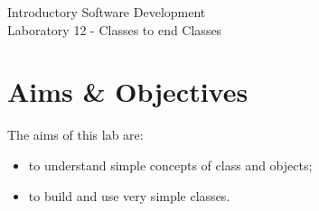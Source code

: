 \documentclass[12pt,oneside]{cttutorial}
\begin{document}
\tutorialextra{}


 

\newcommand{\xkcd}[2]{
	\begin{center}
	\texttt{[image: ../../Figures/png/\#1]}
	\newline
	\url{http://xkcd.com/#2}
	\end{center}
	\bigskip
}

\newcommand{\alert}[1]
{\marginpar
  {\makebox[0 pt][l]
    {\texttt{[image: ../../Figures/png/warning.png]}
  }
  \parbox{2 cm}{{\sffamily \bfseries \tiny #1}}}}


\renewcommand{\baselinestretch}{1.5}
\textwidth=15cm

\newcommand{\I}{j}

\begin{center}
\begin{bfseries}
Introductory Software Development\\Laboratory 12 - Classes to end Classes
\end{bfseries}
\end{center}

\section{Aims \& Objectives}

The aims of this lab are:

\begin{itemize}
\item to understand simple concepts of class and objects;
\item to build and use very simple classes.
\end{itemize}
\end{document}
